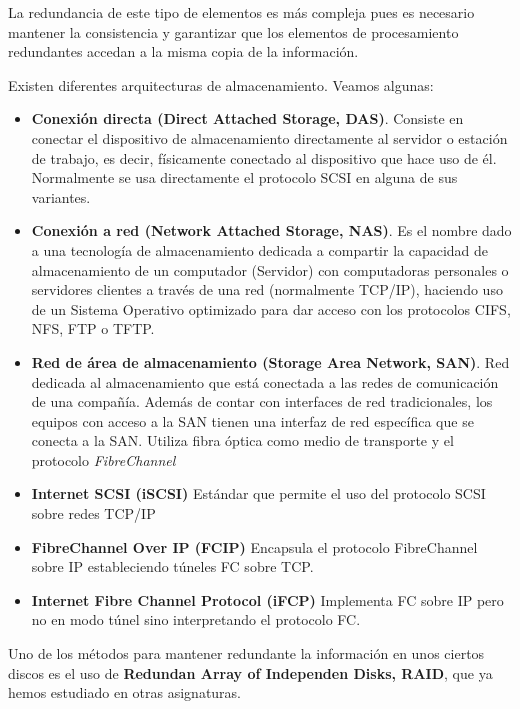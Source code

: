 La redundancia de este tipo de elementos es más compleja pues es necesario mantener la consistencia y garantizar que los elementos de procesamiento redundantes accedan a la misma copia de la información.

Existen diferentes arquitecturas de almacenamiento. Veamos algunas:
\begin{itemize}
\item \textbf{Conexión directa (Direct Attached Storage, DAS)}. Consiste en conectar el dispositivo de almacenamiento directamente al servidor o estación de trabajo, es decir, físicamente conectado al dispositivo que hace uso de él. Normalmente se usa directamente el protocolo SCSI en alguna de sus variantes.

\item \textbf{Conexión a red (Network Attached Storage, NAS)}. Es el nombre dado a una tecnología de almacenamiento dedicada a compartir la capacidad de almacenamiento de un computador (Servidor) con computadoras personales o servidores clientes a través de una red (normalmente TCP/IP), haciendo uso de un Sistema Operativo optimizado para dar acceso con los protocolos CIFS, NFS, FTP o TFTP.

\item \textbf{Red de área de almacenamiento (Storage Area Network, SAN)}. Red dedicada al almacenamiento que está conectada a las redes de comunicación de una compañía. Además de contar con interfaces de red tradicionales, los equipos con acceso a la SAN tienen una interfaz de red específica que se conecta a la SAN. Utiliza fibra óptica como medio de transporte y el protocolo \textit{FibreChannel}

\item \textbf{Internet SCSI (iSCSI)} Estándar que permite el uso del protocolo SCSI sobre redes TCP/IP

\item \textbf{FibreChannel Over IP (FCIP)} Encapsula el protocolo FibreChannel sobre IP estableciendo túneles FC sobre TCP.

\item \textbf{Internet Fibre Channel Protocol (iFCP)} Implementa FC sobre IP pero no en modo túnel sino interpretando el protocolo FC.
\end{itemize}

Uno de los métodos para mantener redundante la información en unos ciertos discos es el uso de \textbf{Redundan Array of Independen Disks, RAID}, que ya hemos estudiado en otras asignaturas.

